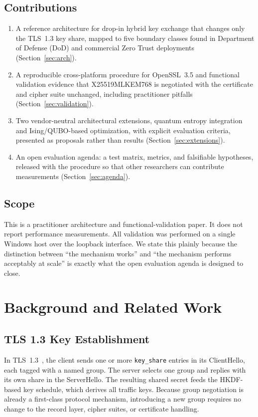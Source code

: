 \documentclass[conference]{IEEEtran}
\begin{document}
\subsection{Contributions}
\begin{enumerate}
  \item A reference architecture for drop-in hybrid key exchange that changes only the TLS~1.3 key share, mapped to five boundary classes found in Department of Defense (DoD) and commercial Zero Trust deployments (Section~\ref{sec:arch}).
  \item A reproducible cross-platform procedure for OpenSSL~3.5 and functional validation evidence that X25519MLKEM768 is negotiated with the certificate and cipher suite unchanged, including practitioner pitfalls (Section~\ref{sec:validation}).
  \item Two vendor-neutral architectural extensions, quantum entropy integration and Ising/QUBO-based optimization, with explicit evaluation criteria, presented as proposals rather than results (Section~\ref{sec:extensions}).
  \item An open evaluation agenda: a test matrix, metrics, and falsifiable hypotheses, released with the procedure so that other researchers can contribute measurements (Section~\ref{sec:agenda}).
\end{enumerate}

\subsection{Scope}
This is a practitioner architecture and functional-validation paper. It does not report performance measurements. All validation was performed on a single Windows host over the loopback interface. We state this plainly because the distinction between ``the mechanism works'' and ``the mechanism performs acceptably at scale'' is exactly what the open evaluation agenda is designed to close.

\section{Background and Related Work}

\subsection{TLS 1.3 Key Establishment}
In TLS~1.3~\cite{rfc8446}, the client sends one or more \texttt{key\_share} entries in its ClientHello, each tagged with a named group. The server selects one group and replies with its own share in the ServerHello. The resulting shared secret feeds the HKDF-based key schedule, which derives all traffic keys. Because group negotiation is already a first-class protocol mechanism, introducing a new group requires no change to the record layer, cipher suites, or certificate handling.
\end{document}
